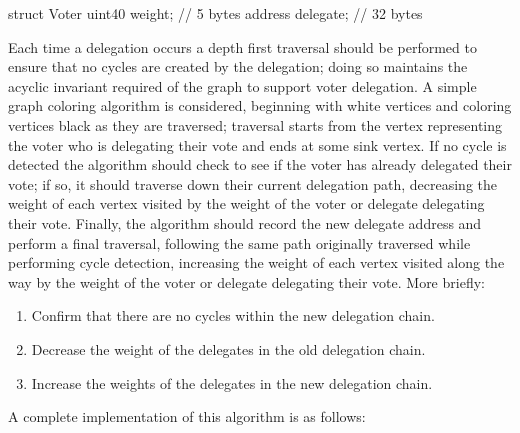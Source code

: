 \begin{solidity}
struct Voter {
  uint40 weight; // 5 bytes
  address delegate; // 32 bytes
}
\end{solidity}

Each time a delegation occurs a depth first traversal should be performed to
ensure that no cycles are created by the delegation; doing so maintains the
acyclic invariant required of the graph to support voter delegation. A simple
graph coloring algorithm is considered, beginning with white vertices and
coloring vertices black as they are traversed; traversal starts from the vertex
representing the voter who is delegating their vote and ends at some sink
vertex. If no cycle is detected the algorithm should check to see if the voter
has already delegated their vote; if so, it should traverse down their current
delegation path, decreasing the weight of each vertex visited by the weight
of the voter or delegate delegating their vote. Finally, the algorithm should
record the new delegate address and perform a final traversal, following the
same path originally traversed while performing cycle detection, increasing the
weight of each vertex visited along the way by the weight of the voter or
delegate delegating their vote. More briefly:
\begin{enumerate}
  \item Confirm that there are no cycles within the new delegation chain.
  \item Decrease the weight of the delegates in the old delegation chain.
  \item Increase the weights of the delegates in the new delegation chain.
\end{enumerate}
A complete implementation of this algorithm is as follows:\footnotemark{}



